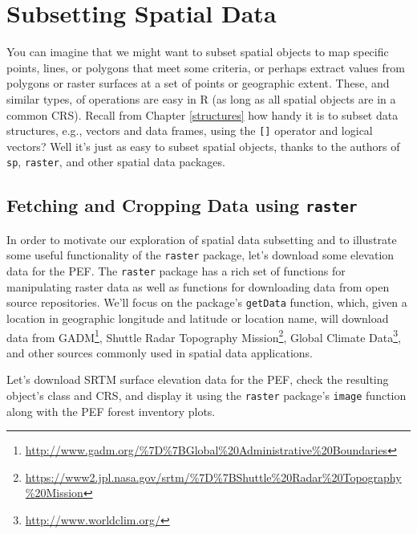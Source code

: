 \documentclass[
]{krantz}
\renewcommand{\href}[2]{#2\footnote{\url{#1}}}
\begin{document}
\hypertarget{subsetting-spatial-data}{%
\section{Subsetting Spatial Data}\label{subsetting-spatial-data}}

You can imagine that we might want to subset spatial objects to map specific points, lines, or polygons that meet some criteria, or perhaps extract values from polygons or raster surfaces at a set of points or geographic extent. These, and similar types, of operations are easy in R (as long as all spatial objects are in a common CRS). Recall from Chapter \ref{structures} how handy it is to subset data structures, e.g., vectors and data frames, using the \texttt{{[}{]}} operator and logical vectors? Well it's just as easy to subset spatial objects, thanks to the authors of \texttt{sp}, \texttt{raster}, and other spatial data packages.

\hypertarget{fetching-and-cropping-data-using-raster}{%
\subsection{\texorpdfstring{Fetching and Cropping Data using \texttt{raster}}{Fetching and Cropping Data using raster}}\label{fetching-and-cropping-data-using-raster}}

In order to motivate our exploration of spatial data subsetting and to illustrate some useful functionality of the \texttt{raster} package, let's download some elevation data for the PEF. The \texttt{raster} package has a rich set of functions for manipulating raster data as well as functions for downloading data from open source repositories. We'll focus on the package's \texttt{getData} function, which, given a location in geographic longitude and latitude or location name, will download data from \href{http://www.gadm.org/\%7D\%7BGlobal\%20Administrative\%20Boundaries}{GADM}, \href{https://www2.jpl.nasa.gov/srtm/\%7D\%7BShuttle\%20Radar\%20Topography\%20Mission}{Shuttle Radar Topography Mission}, \href{http://www.worldclim.org/}{Global Climate Data}, and other sources commonly used in spatial data applications.

Let's download SRTM surface elevation data for the PEF, check the resulting object's class and CRS, and display it using the \texttt{raster} package's \texttt{image} function along with the PEF forest inventory plots.
\end{document}

